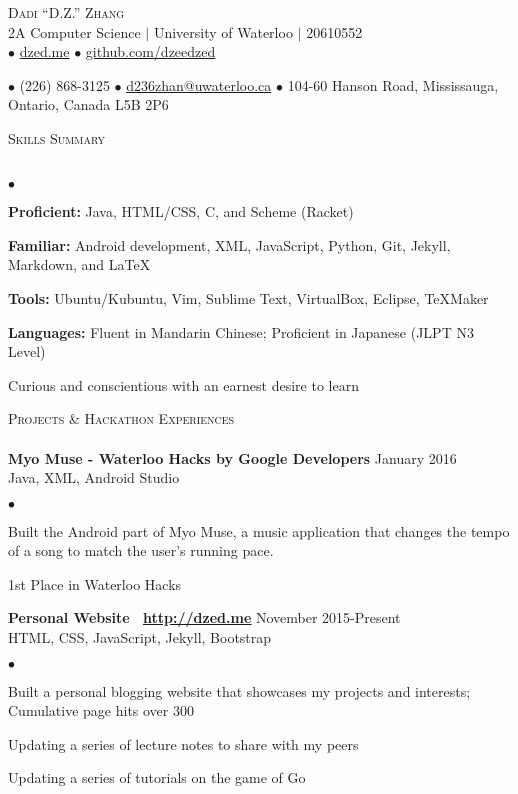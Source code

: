 \documentclass{article}
\newcommand{\lineunder}{\vspace*{-8pt} \\ \hspace*{-18pt} \hrulefill \\}
\newcommand{\header}[1]{{\hspace*{-15pt}\vspace*{6pt} \textsc{#1}} \vspace*{-6pt} \lineunder}
\newcommand{\employer}[3]{{ \textbf{#1} \hfill #2\\ {#3}\\  }}
\newcommand{\contact}[3]{
\begin{center}
{}
\end{center}
\vspace*{-8pt}
\begin{center}
{\LARGE \scshape {#1}}\\
#2\\
#3
\end{center}
\vspace*{-8pt}
}
\newenvironment{achievements}{\begin{list}{$\bullet$}{\topsep 0pt \itemsep -2pt}}{\vspace*{4pt}\end{list}}
\begin{document}
\small
\smallskip
\vspace*{-44pt}

\contact{Dadi ``D.Z.'' Zhang}
{2A Computer Science $\vert$ University of Waterloo $\vert$ 20610552}
{$\bullet$ \href{http://dzed.me}{dzed.me}
$\bullet$ \href{http://github.com/dzeedzed}{github.com/dzeedzed}}
{$\bullet$ (226) 868-3125
$\bullet$ \href{mailto:d236zhan@uwaterloo.ca}{d236zhan@uwaterloo.ca}
$\bullet$ 104-60 Hanson Road, Mississauga, Ontario, Canada L5B 2P6}

\hfill \break
\header{Skills Summary}
\begin{achievements}
\item \textbf{Proficient:} Java, HTML/CSS, C, and Scheme (Racket)
\item \textbf{Familiar:} Android development, XML, JavaScript, Python, Git, Jekyll, Markdown, and  \LaTeX\
\item \textbf{Tools:} Ubuntu/Kubuntu, Vim, Sublime Text, VirtualBox, Eclipse, TeXMaker
\item \textbf{Languages:} Fluent in Mandarin Chinese; Proficient in Japanese (JLPT N3 Level)
\item Curious and conscientious with an earnest desire to learn 
\end{achievements}

\header{Projects \& Hackathon Experiences}

\employer{Myo Muse - Waterloo Hacks by Google Developers}{January 2016}{Java, XML, Android Studio}
	\begin{achievements}
	\item Built the Android part of Myo Muse, a music application that changes the tempo of a song to match the user's running pace.
	\item 1st Place in Waterloo Hacks
	\end{achievements}
	
\employer{Personal Website \hspace{5pt} \Mundus~\href{http://dzed.me}{\underline{http://dzed.me}}}{November 2015-Present}{HTML, CSS, JavaScript, Jekyll, Bootstrap}
	\begin{achievements}
	\item Built a personal blogging website that showcases my projects and interests; Cumulative page hits over 300
	\item Updating a series of lecture notes to share with my peers
	\item Updating a series of tutorials on the game of Go
	\end{achievements}
	
\end{document}
